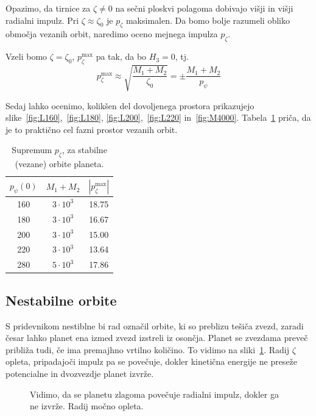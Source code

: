 \documentclass[12pt, a4paper]{article}
\begin{document}
Opazimo, da tirnice za $\zeta \neq 0$ na se\v cni ploskvi polagoma dobivajo vi\v sji in vi\v sji radialni
impulz. Pri $\zeta \approx \zeta_0$ je $p_\zeta$ maksimalen. Da bomo bolje razumeli obliko obmo\v cja
vezanih orbit, naredimo oceno mejnega impulza $p_\zeta$.

Vzeli bomo $\zeta = \zeta_0$, $p_\zeta^\text{max}$ pa tak, da bo $H_3 = 0$, tj.
\begin{equation}
	p_\zeta^\text{max} \approx \sqrt{\frac{M_1 + M_2}{\zeta_0}} = \pm \frac{M_1 + M_2}{p_\psi}
\end{equation}

Sedaj lahko ocenimo, kolik\v sen del dovoljenega prostora prikazujejo slike~\ref{fig:L160},~\ref{fig:L180},
\ref{fig:L200},~\ref{fig:L220} in~\ref{fig:M4000}. Tabela~\ref{tab2} pri\v ca, da je to prakti\v cno cel
fazni prostor vezanih orbit.
\begin{table}[H]\centering
	\caption{Supremum $p_\zeta$, za stabilne (vezane) orbite planeta.}
	\begin{tabular}{c|c|c}
		$p_\psi(0)$ & $M_1 + M_2$ & $|p_\zeta^\text{max}|$ \\
		\hline
		160 & $3\cdot 10^3$ & 18.75 \\
		180 & $3\cdot 10^3$ & 16.67 \\
		200 & $3\cdot 10^3$ & 15.00 \\
		220 & $3\cdot 10^3$ & 13.64 \\
		280 & $5\cdot 10^3$ & 17.86
	\end{tabular}
	\label{tab2}
\end{table}

\subsection{Nestabilne orbite}

S pridevnikom nestiblne bi rad ozna\v cil orbite, ki so preblizu te\v si\v ca zvezd, zaradi \v cesar
lahko planet ena izmed zvezd izstreli iz oson\v cja. Planet se zvezdama preve\v c pribli\v za tudi, \v ce
ima premajhno vrtilno koli\v cino. To vidimo na sliki~\ref{fig:fail}. Radij $\zeta$ opleta, pripadajo\v ci
impulz pa se pove\v cuje, dokler kineti\v cna energije ne prese\v ze potencialne in dvozvezdje planet izvr\v ze.

\begin{figure}[H]\centering
	
	\caption{Vidimo, da se planetu zlagoma pove\v cuje radialni impulz, dokler ga ne izvr\v ze. Radij
		mo\v cno opleta.}
	\label{fig:fail}
\end{figure}
\end{document}
